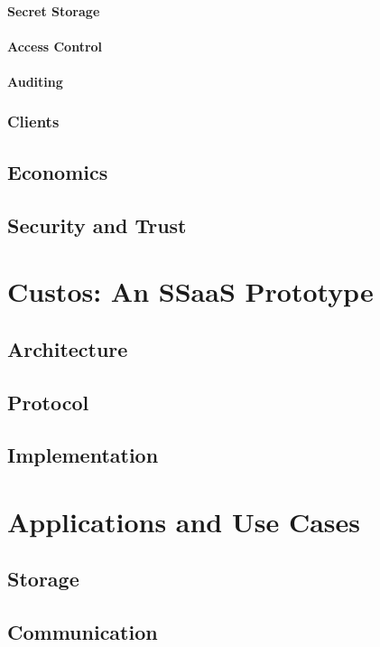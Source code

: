 \documentclass[defaultstyle,11pt]{thesis}
\begin{document}
\subsubsection{Secret Storage}
\subsubsection{Access Control}
\subsubsection{Auditing}
\subsection{Clients}
\section{Economics}
\section{Security and Trust}

%
\chapter{Custos: An SSaaS Prototype}
\label{chap:custos}

\section{Architecture}
\section{Protocol}
\section{Implementation}

%
\chapter{Applications and Use Cases}
\label{chap:apps}

\section{Storage}
\section{Communication}
\end{document}
